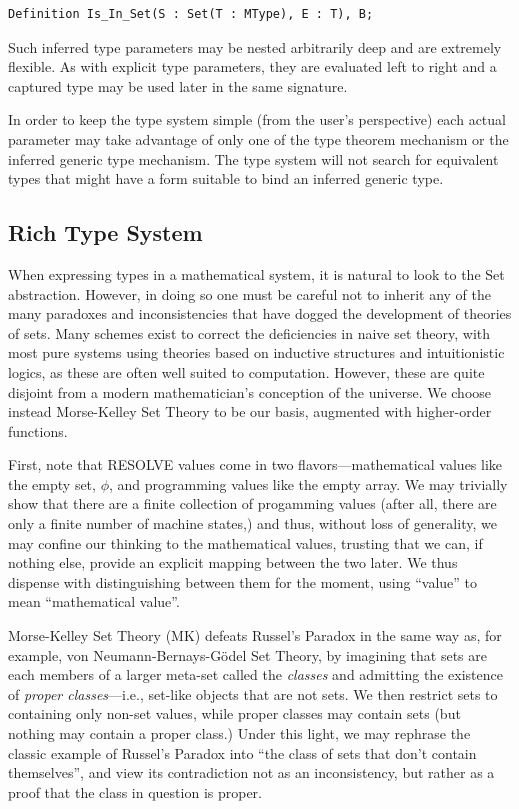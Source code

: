\begin{lstlisting}
Definition Is_In_Set(S : Set(T : MType), E : T), B;
\end{lstlisting}

Such inferred type parameters may be nested arbitrarily deep and are extremely flexible.  As with explicit type parameters, they are evaluated left to right and a captured type may be used later in the same signature.

In order to keep the type system simple (from the user's perspective) each actual parameter may take advantage of only one of the type theorem mechanism or the inferred generic type mechanism.  The type system will not search for equivalent types that might have a form suitable to bind an inferred generic type.

	\subsection{Rich Type System\label{richTypeSystem}}

When expressing types in a mathematical system, it is natural to look to the Set abstraction.  However, in doing so one must be careful not to inherit any of the many paradoxes and inconsistencies that have dogged the development of theories of sets.  Many schemes exist to correct the deficiencies in naive set theory, with most pure systems using theories based on inductive structures and intuitionistic logics, as these are often well suited to computation.  However, these are quite disjoint from a modern mathematician's conception of the universe.  We choose instead Morse-Kelley Set Theory to be our basis, augmented with higher-order functions.

First, note that RESOLVE values come in two flavors---mathematical values like the empty set, $\phi$, and programming values like the empty array.  We may trivially show that there are a finite collection of progamming values (after all, there are only a finite number of machine states,) and thus, without loss of generality, we may confine our thinking to the mathematical values, trusting that we can, if nothing else, provide an explicit mapping between the two later.  We thus dispense with distinguishing between them for the moment, using ``value'' to mean ``mathematical value''.

Morse-Kelley Set Theory (MK) defeats Russel's Paradox in the same way as, for example, von Neumann-Bernays-G\"{o}del Set Theory, by imagining that sets are each members of a larger meta-set called the \emph{classes} and admitting the existence of \emph{proper classes}---i.e., set-like objects that are not sets.  We then restrict sets to containing only non-set values, while proper classes may contain sets (but nothing may contain a proper class.)  Under this light, we may rephrase the classic example of Russel's Paradox into ``the class of sets that don't contain themselves'', and view its contradiction not as an inconsistency, but rather as a proof that the class in question is proper.

